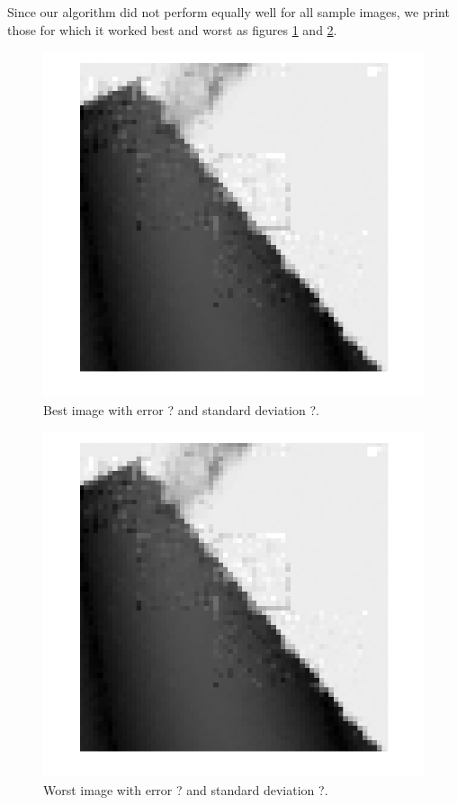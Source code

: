 \documentclass[10pt,conference,compsocconf]{IEEEtran}
\begin{document}
Since our algorithm did not perform equally well for all sample images, we print those for which it worked best and worst as figures \ref{best_image} and \ref{worst_image}.

\begin{figure}
\centering
\includegraphics[width=\columnwidth]{images/framing_artifacts.png}
\caption{Best image with error ? and standard deviation ?.}
\label{best_image}
\end{figure}

\begin{figure}
\centering
\includegraphics[width=\columnwidth]{images/framing_artifacts.png}
\caption{Worst image with error ? and standard deviation ?.}
\label{worst_image}
\end{figure}
\end{document}
